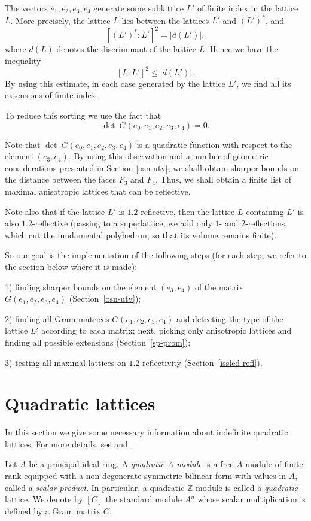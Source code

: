 \documentclass[14pt]{article}
\begin{document}
The vectors $e_1, e_2, e_3, e_4$ generate some sublattice $L '$
of finite index in the lattice $L$. More precisely, the lattice $ L $ lies between
the lattices $L'$ and $(L')^*$, and
$$[(L ')^* \colon L']^2 = |d (L ')|,$$
where $d (L)$ denotes the discriminant of the lattice $L$.
Hence we have the inequality
$$[L \colon L ']^2 \le |d (L')|.$$
By using this estimate,  in each case generated by the lattice $L '$,
we find  all its extensions of finite index.

To reduce this sorting we use the fact that
$$
\det \ G (e_0, e_1, e_2, e_3, e_4) = 0.
$$

Note that $\det \ G(e_0, e_1, e_2, e_3, e_4)$ is a quadratic function
with respect to the element $(e_3, e_4)$. By using this observation and a number of
geometric considerations presented in Section \ref {osn-utv},
we shall obtain sharper bounds on the distance between the faces $F_3$ and $F_4$.
Thus, we shall obtain a finite list of maximal anisotropic
lattices that can be reflective.

Note also that if the lattice $L '$ is $1.2$-reflective, then the lattice
 $L$ containing
$L'$ is also $1.2$-reflective (passing to a superlattice, we add only
$1$- and $2$-reflections, which cut the fundamental polyhedron,
so that its volume remains finite).

So our goal is the implementation of
the following steps (for each step, we refer to the section below where it is made):

1) finding sharper bounds on the element $(e_3, e_4)$ of the matrix
$G (e_1, e_2, e_3, e_4)$ (Section~\ref{osn-utv});

2) finding all Gram matrices $G (e_1, e_2, e_3, e_4) $ and detecting
the type of the lattice $L'$ according to each matrix; next, picking  only anisotropic
lattices and finding all possible extensions (Section~\ref{sp-prom});

3) testing all maximal lattices on $1.2$-reflectivity
(Section~\ref{issled-refl}).



\section{Quadratic lattices}\label{quadratic-forms}


In this section we give some necessary information about
indefinite quadratic lattices. For more details, see \cite{kassels82qf} and
\cite{vinberg84abskr}.

Let $A$ be a principal ideal ring. A \textit{quadratic $ A $-module} is a
free $A$-module of finite rank equipped with a non-degenerate
 symmetric bilinear form
with values in $A$, called a \textit{scalar product}. In particular,
a quadratic $\mathbb{Z}$-module is called
a \textit{quadratic} lattice.
We denote by $[C]$ the standard module $A^n$ whose
scalar multiplication is defined by a Gram matrix $C$.
\end{document}
